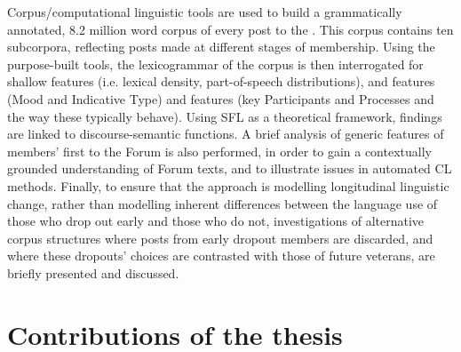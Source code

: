 Corpus\slash computational linguistic tools are used to build a grammatically annotated, 8.2 million word corpus of every post to the . This \gls{corpus} contains ten subcorpora, reflecting \glspl{post} made at different stages of membership. Using the purpose\hyp{}built tools, the \gls{lexicogrammar} of the corpus is then interrogated for shallow features (i.e. lexical density, part\hyp{}of\hyp{}speech distributions),  and  features (Mood and Indicative Type) and  features (key Participants and Processes and the way these typically behave). Using \gls{SFL} as a theoretical framework,  findings are linked to \gls{discourse-semantic} functions. A brief analysis of generic features of \glspl{member}' first  to the \gls{Forum} is also performed, in order to gain a contextually grounded understanding of \gls{Forum} texts, and to illustrate issues in automated \gls{CL} methods. Finally, to ensure that the approach is modelling longitudinal linguistic change, rather than modelling inherent differences between the language use of those who drop out early and those who do not, investigations of alternative corpus structures where posts from early dropout members are discarded, and where these dropouts' choices are contrasted with those of future veterans, are briefly presented and discussed.


\section{Contributions of the thesis}

